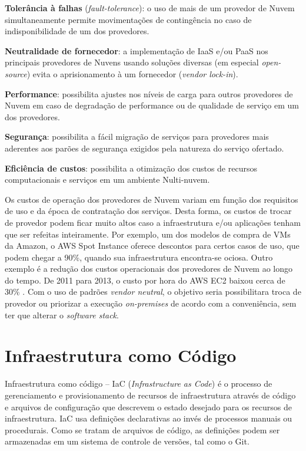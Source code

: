 \documentclass[12pt]{article}
\begin{document}
	\textbf{Tolerância à falhas} (\textit{fault-tolerance}): o uso de mais de um provedor de Nuvem simultaneamente permite movimentações de contingência no caso de indisponibilidade de um dos provedores.
	
	\textbf{Neutralidade de fornecedor}: a implementação de IaaS e/ou PaaS nos principais provedores de Nuvens usando soluções diversas (em especial \textit{open-source}) evita o aprisionamento à um fornecedor (\textit{vendor lock-in}).
	
	\textbf{Performance}: possibilita ajustes nos níveis de carga para outros provedores de Nuvem em caso de degradação de performance ou de qualidade de serviço em um dos provedores.
	
	\textbf{Segurança}: possibilita a fácil migração de serviços para provedores mais aderentes aos parões de segurança exigidos pela natureza do serviço ofertado.
	
	\textbf{Eficiência de custos}: possibilita a otimização dos custos de recursos computacionais e serviços em um ambiente Nulti-nuvem.
	
	Os custos de operação dos provedores de Nuvem variam em função dos requisitos de uso e da época de contratação dos serviços. Desta forma, os custos de trocar de provedor podem ficar muito altos caso a infraestrutura e/ou aplicações tenham que ser refeitas inteiramente. Por exemplo, um dos modelos de compra de VMs da Amazon, o AWS Spot Instance oferece descontos para certos casos de uso, que podem chegar a 90\%, quando sua infraestrutura encontra-se ociosa. Outro exemplo é a redução dos custos operacionais dos provedores de Nuvem ao longo do tempo. De 2011 para 2013, o custo por hora do AWS EC2 baixou cerca de 30\% \cite{Golden:2013}. Com o uso de padrões \textit{vendor neutral}, o objetivo seria possibilitara troca de provedor ou priorizar a execução \textit{on-premises} de acordo com a conveniência, sem ter que alterar o \textit{software stack}.
	
	\section{Infraestrutura como Código}
	
	Infraestrutura como código – IaC (\textit{Infrastructure as Code}) é o processo de gerenciamento e provisionamento de recursos de infraestrutura através de código e arquivos de configuração que descrevem o estado desejado para os recursos de infraestrutura. IaC usa definições declarativas ao invés de processos manuais ou procedurais. Como se tratam de arquivos de código, as definições podem ser armazenadas em um sistema de controle de versões, tal como o Git.
	 
\end{document}
